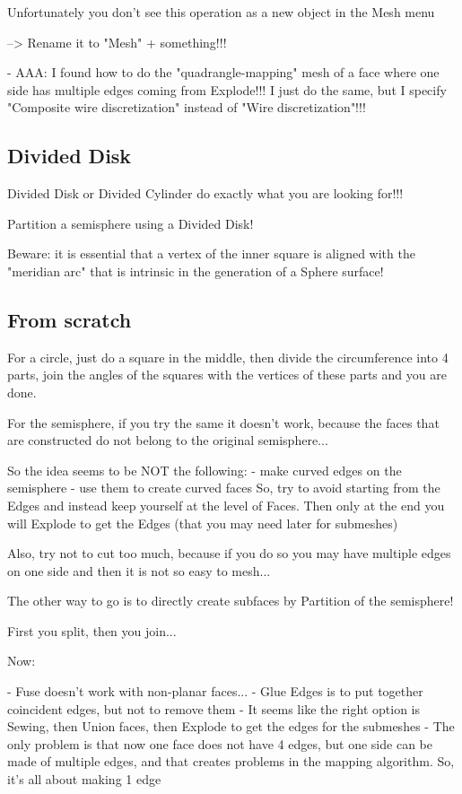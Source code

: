 \documentclass[10pt]{book}
\begin{document}
          Unfortunately you don't see this operation as a new object in the Mesh menu
          
     --> Rename it to "Mesh" + something!!!
     
 
- AAA: I found how to do the "quadrangle-mapping" mesh of a face where one side has multiple edges coming from Explode!!! 
  I just do the same, but I specify "Composite wire discretization" instead of "Wire discretization"!!!
    
 

\subsection{Divided Disk}

Divided Disk or Divided Cylinder do exactly what you are looking for!!!

Partition a semisphere using a Divided Disk!

Beware: it is essential that a vertex of the inner square is aligned with the "meridian arc" that is intrinsic in the generation of a Sphere surface!

\subsection{From scratch}

For a circle, just do a square in the middle, then divide the circumference into 4 parts,
join the angles of the squares with the vertices of these parts and you are done.

For the semisphere, if you try the same it doesn't work, because the faces that are constructed
do not belong to the original semisphere...

So the idea seems to be NOT the following:
 - make curved edges on the semisphere
 - use them to create curved faces
  So, try to avoid starting from the Edges and instead keep yourself at the level of Faces.
  Then only at the end you will Explode to get the Edges (that you may need later for submeshes)
  
  Also, try not to cut too much, because if you do so you may have multiple edges on one side and then it is not so easy to mesh...
 
 The other way to go is to directly create subfaces by Partition of the semisphere!
 
 First you split, then you join...
 
 Now:
 
 - Fuse doesn't work with non-planar faces...
 - Glue Edges is to put together coincident edges, but not to remove them
 - It seems like the right option is Sewing, then Union faces, then Explode to get the edges for the submeshes
 - The only problem is that now one face does not have 4 edges, but one side can be made of multiple edges,
   and that creates problems in the mapping algorithm. So, it's all about making 1 edge
   
\end{document}
